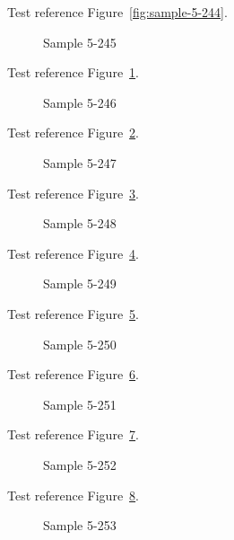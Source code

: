 Test reference Figure~\ref{fig:sample-5-244}.

\begin{figure}[tbhp]
\caption{Sample 5-245}
\label{fig:sample-5-245}
\end{figure}

Test reference Figure~\ref{fig:sample-5-245}.

\begin{figure}[tbhp]
\caption{Sample 5-246}
\label{fig:sample-5-246}
\end{figure}

Test reference Figure~\ref{fig:sample-5-246}.

\begin{figure}[tbhp]
\caption{Sample 5-247}
\label{fig:sample-5-247}
\end{figure}

Test reference Figure~\ref{fig:sample-5-247}.

\begin{figure}[tbhp]
\caption{Sample 5-248}
\label{fig:sample-5-248}
\end{figure}

Test reference Figure~\ref{fig:sample-5-248}.

\begin{figure}[tbhp]
\caption{Sample 5-249}
\label{fig:sample-5-249}
\end{figure}

Test reference Figure~\ref{fig:sample-5-249}.

\begin{figure}[tbhp]
\caption{Sample 5-250}
\label{fig:sample-5-250}
\end{figure}

Test reference Figure~\ref{fig:sample-5-250}.

\begin{figure}[tbhp]
\caption{Sample 5-251}
\label{fig:sample-5-251}
\end{figure}

Test reference Figure~\ref{fig:sample-5-251}.

\begin{figure}[tbhp]
\caption{Sample 5-252}
\label{fig:sample-5-252}
\end{figure}

Test reference Figure~\ref{fig:sample-5-252}.

\begin{figure}[tbhp]
\caption{Sample 5-253}
\label{fig:sample-5-253}
\end{figure}

